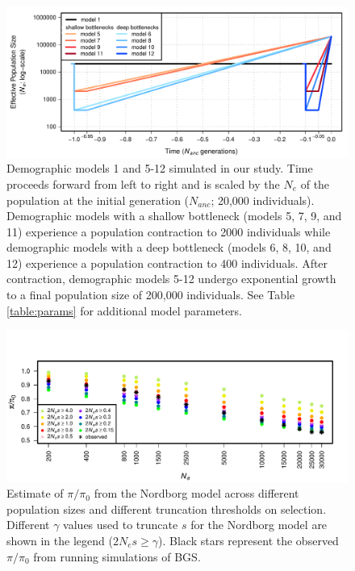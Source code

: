 \documentclass[9pt,twocolumn,twoside]{rilabRxiv}
\begin{document}
\begin{figure}[t]
\includegraphics[width=0.8\linewidth]{figures/FigS2.pdf}
\caption{Demographic models 1 and 5-12 simulated in our study.
Time proceeds forward from left to right and is scaled by the $N_e$ of the population at the initial generation ($N_{anc}$; 20,000 individuals).
Demographic models with a shallow bottleneck (models 5, 7, 9, and 11) experience a population contraction to 2000 individuals while demographic models with a deep bottleneck (models 6, 8, 10, and 12) experience a population contraction to 400 individuals.
After contraction, demographic models 5-12 undergo exponential growth to a final population size of 200,000 individuals.
See Table \ref{table:params} for additional model parameters.}
\label{fig:models2}
\end{figure}
\pagebreak

\begin{figure}[t]
\includegraphics[width=.9\linewidth]{figures/FigS21.pdf}
\caption{Estimate of $\pi/\pi_0$ from the Nordborg model across different population sizes and different truncation thresholds on selection.
Different $\gamma$ values used to truncate $s$ for the Nordborg model are shown in the legend ($2N_es \geq \gamma$).
Black stars represent the observed $\pi/\pi_0$ from running simulations of BGS.}
\label{fig:nordborgsims}
\end{figure}
\pagebreak
\end{document}
